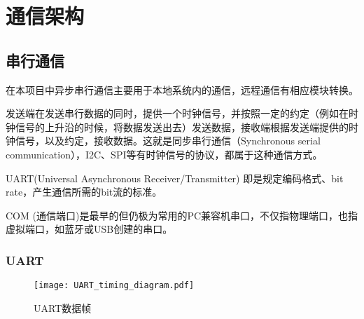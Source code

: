 \chapter{通信架构}
\label{cha:Communication}

\section{串行通信}

在本项目中异步串行通信主要用于本地系统内的通信，远程通信有相应模块转换。

发送端在发送串行数据的同时，提供一个时钟信号，并按照一定的约定（例如在时钟信号的上升沿的时候，将数据发送出去）发送数据，接收端根据发送端提供的时钟信号，以及约定，接收数据。这就是同步串行通信（Synchronous serial communication），I2C、SPI等有时钟信号的协议，都属于这种通信方式。


UART(Universal Asynchronous Receiver/Transmitter) 即是规定编码格式、bit rate，产生通信所需的bit流的标准。

COM (通信端口)是最早的但仍极为常用的PC兼容机串口，不仅指物理端口，也指虚拟端口，如蓝牙或USB创建的串口。

\subsection{UART}

\begin{figure}[htbp]
    \centering
    \texttt{[image: UART\_timing\_diagram.pdf]}
    \caption{UART数据帧}
    \label{fig:UART-Data-framing}
\end{figure}




